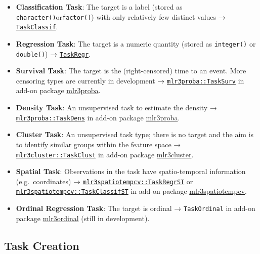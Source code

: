 \documentclass[
]{scrbook}
\begin{document}
\begin{itemize}
\item
  \textbf{Classification Task}: The target is a label (stored as \texttt{character()}or\texttt{factor()}) with only relatively few distinct values → \href{https://mlr3.mlr-org.com/reference/TaskClassif.html}{\texttt{TaskClassif}}.
\item
  \textbf{Regression Task}: The target is a numeric quantity (stored as \texttt{integer()} or \texttt{double()}) → \href{https://mlr3.mlr-org.com/reference/TaskRegr.html}{\texttt{TaskRegr}}.
\item
  \textbf{Survival Task}: The target is the (right-censored) time to an event. More censoring types are currently in development → \href{https://mlr3proba.mlr-org.com/reference/TaskSurv.html}{\texttt{mlr3proba::TaskSurv}} in add-on package \href{https://mlr3proba.mlr-org.com}{mlr3proba}.
\item
  \textbf{Density Task}: An unsupervised task to estimate the density → \href{https://mlr3proba.mlr-org.com/reference/TaskDens.html}{\texttt{mlr3proba::TaskDens}} in add-on package \href{https://mlr3proba.mlr-org.com}{mlr3proba}.
\item
  \textbf{Cluster Task}: An unsupervised task type; there is no target and the aim is to identify similar groups within the feature space → \href{https://mlr3cluster.mlr-org.com/reference/TaskClust.html}{\texttt{mlr3cluster::TaskClust}} in add-on package \href{https://mlr3cluster.mlr-org.com}{mlr3cluster}.
\item
  \textbf{Spatial Task}: Observations in the task have spatio-temporal information (e.g.~coordinates) → \href{https://www.rdocumentation.org/packages/mlr3spatiotempcv/topics/TaskRegrST}{\texttt{mlr3spatiotempcv::TaskRegrST}} or \href{https://www.rdocumentation.org/packages/mlr3spatiotempcv/topics/TaskClassifST}{\texttt{mlr3spatiotempcv::TaskClassifST}} in add-on package \href{https://mlr3spatiotempcv.mlr-org.com}{mlr3spatiotempcv}.
\item
  \textbf{Ordinal Regression Task}: The target is ordinal → \texttt{TaskOrdinal} in add-on package \href{https://github.com/mlr-org/mlr3ordinal}{mlr3ordinal} (still in development).
\end{itemize}

\hypertarget{tasks-creation}{%
\subsection{Task Creation}\label{tasks-creation}}
\end{document}
